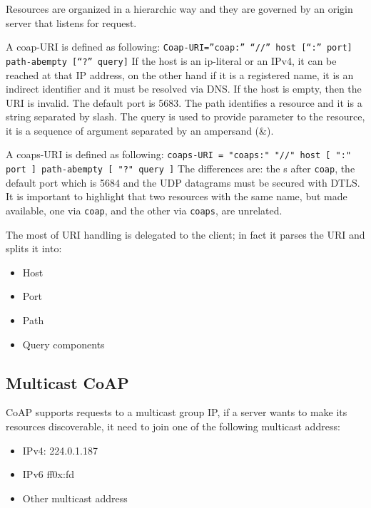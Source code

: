 	Resources are organized in a hierarchic way and they are governed by an origin server that listens for request.
	
	A coap-URI is defined as following:
	\texttt{Coap-URI=”coap:” “//” host [“:” port] path-abempty [“?” query]}
	If the host is an ip-literal or an IPv4, it can be reached at that IP address, on the other hand if it is a registered name, it is an indirect identifier and it must be resolved via DNS.\newline
	If the host is empty, then the URI is invalid.\newline
	The default port is 5683.\newline
	The path identifies a resource and it is a string separated by slash.\newline
	The query is used to provide parameter to the resource, it is a sequence of argument separated by an ampersand (\&).
	
	A coaps-URI is defined as following:
	\texttt{coaps-URI = "coaps:" "//" host [ ":" port ] path-abempty [ "?" query ]}
	The differences are: the s after \texttt{coap}, the default port which is 5684 and the UDP datagrams must be secured with DTLS.
	It is important to highlight that two resources with the same name, but made available, one via \texttt{coap}, and the other via \texttt{coaps}, are unrelated.
	
	The most of URI handling is delegated to the client; in fact it parses the URI and splits it into:\newline
	\begin{itemize}
		\item Host
		\item Port
		\item Path
		\item Query components
	\end{itemize}
	
	\subsection{Multicast CoAP}
	CoAP supports requests to a multicast group IP, if a server wants to make its resources discoverable, it need to join one of the following multicast address:
	\begin{itemize}
		\item IPv4: 224.0.1.187
		\item IPv6 ff0x:fd
		\item Other multicast address
	\end{itemize}

